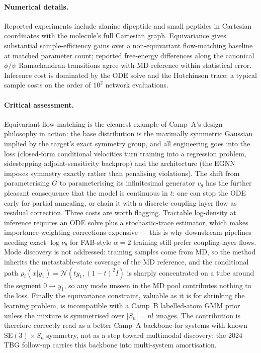 \documentclass[11pt,letterpaper]{article}
\theoremstyle{plain}
\begin{document}
\paragraph{Numerical details.} Reported experiments include alanine dipeptide
and small peptides in Cartesian coordinates with the molecule's full Cartesian
graph. Equivariance gives substantial sample-efficiency gains over a
non-equivariant flow-matching baseline at matched parameter count; reported
free-energy differences along the canonical $\phi$/$\psi$ Ramachandran
transitions agree with MD reference within statistical error. Inference cost is
dominated by the ODE solve and the Hutchinson trace; a typical sample costs on
the order of $10^2$ network evaluations.

\paragraph{Critical assessment.} Equivariant flow matching is the cleanest
example of Camp~A's design philosophy in action: the base distribution is the
maximally symmetric Gaussian implied by the target's exact symmetry group,
and all engineering goes into the loss (closed-form conditional velocities
turn training into a regression problem, sidestepping adjoint-sensitivity
backprop) and the architecture (the EGNN imposes symmetry exactly rather than
penalising violations). The shift from parameterising $G$ to parameterising
its infinitesimal generator $v_\theta$ has the further pleasant consequence
that the model is continuous in $t$: one can stop the ODE early for partial
annealing, or chain it with a discrete coupling-layer flow as residual
correction. Three costs are worth flagging. Tractable log-density at inference
requires an ODE solve plus a stochastic-trace estimator, which makes
importance-weighting corrections expensive --- this is why downstream
pipelines needing exact $\log\nu_\theta$ for FAB-style $\alpha=2$ training
still prefer coupling-layer flows. Mode discovery is not addressed: training
samples come from MD, so the method inherits the metastable-state coverage of
the MD reference, and the conditional path
$\rho_t(x|y_1)=\mathcal N(t y_1,(1-t)^2 I)$ is sharply concentrated on a tube
around the segment $0\to y_1$, so any mode unseen in the MD pool contributes
nothing to the loss. Finally the equivariance constraint, valuable as it is
for shrinking the learning problem, is incompatible with a Camp~B
labelled-atom GMM prior unless the mixture is symmetrised over $|S_n|=n!$
images. The contribution is therefore correctly read as a better Camp~A
backbone for systems with known $\mathrm{SE}(3)\times S_n$ symmetry, not as a
step toward multimodal discovery; the 2024 TBG follow-up carries this
backbone into multi-system amortisation.
\end{document}

